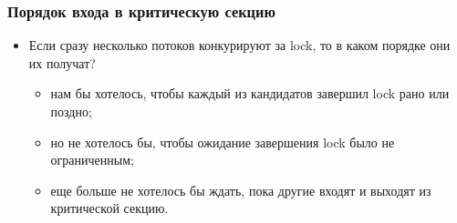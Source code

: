 \begin{frame}
\frametitle{Порядок входа в критическую секцию}
\begin{itemize}
  \item Если сразу несколько потоков конкурируют за lock, то в каком порядке
  они их получат?
  \begin{itemize}
    \item нам бы хотелось, чтобы каждый из кандидатов завершил lock рано или
    поздно;
    \item но не хотелось бы, чтобы ожидание завершения lock было не
    ограниченным;
    \item еще больше не хотелось бы ждать, пока другие входят и выходят из
    критической секцию.
  \end{itemize}
\end{itemize}
\end{frame}


